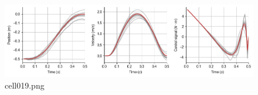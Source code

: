 \begin{figure}[ht]
	\centering
	\includegraphics[scale=0.8, max width=\linewidth]{./fig/motor-learning/optimal-feedback-control/cell019.png}
	\caption{cell019.png}
	\label{cell019.png}
\end{figure}